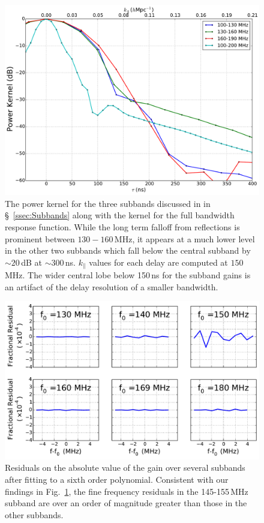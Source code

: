 \documentclass[twocolumn]{emulateapj}
\begin{document}
\begin{figure}[h!]
\includegraphics[width=.5\textwidth]{figures/powerKernelSubbands.pdf}
\caption{The power kernel for the three subbands discussed in in \S~\ref{ssec:Subbands} along with the kernel for the full bandwidth response function. While the long term falloff from reflections is prominent between $130-160$\,MHz, it appears at a much lower level in the other two subbands which fall below the central subband by $\sim 20$\,dB at $\sim 300$\,ns. $k_\parallel$ values for each delay are computed at $150$\,MHz. The wider central lobe below 150\,ns for the subband gains is an artifact of the delay resolution of a smaller bandwidth.}
\label{fig:KernelsSubbands}
\end{figure}


\begin{figure}
\includegraphics[width=\textwidth]{figures/frequency_domain_residuals.pdf}
\caption{Residuals on the absolute value of the gain over several subbands after fitting to a sixth order polynomial. Consistent with our findings in Fig.~\ref{fig:KernelsSubbands}, the fine frequency residuals in the 145-155\,MHz subband are over an order of magnitude greater than those in the other subbands.}
\label{fig:Residuals}
\end{figure}
\end{document}
